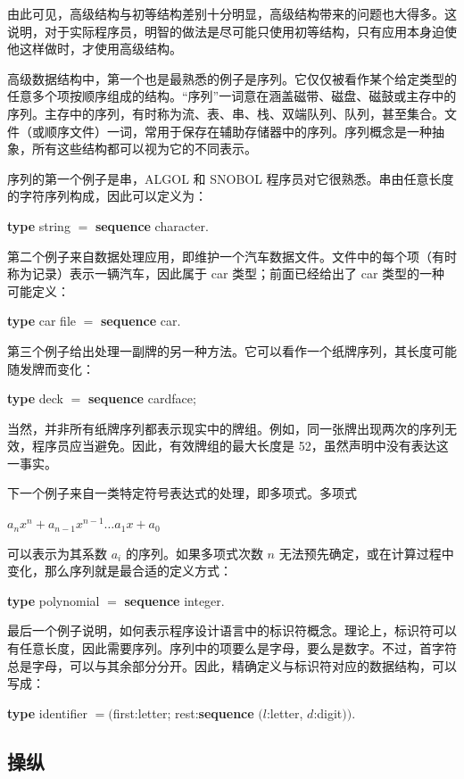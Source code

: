 由此可见，高级结构与初等结构差别十分明显，高级结构带来的问题也大得多。这说明，对于实际程序员，明智的做法是尽可能只使用初等结构，只有应用本身迫使他这样做时，才使用高级结构。

高级数据结构中，第一个也是最熟悉的例子是序列。它仅仅被看作某个给定类型的任意多个项按顺序组成的结构。“序列”一词意在涵盖磁带、磁盘、磁鼓或主存中的序列。主存中的序列，有时称为流、表、串、栈、双端队列、队列，甚至集合。文件（或顺序文件）一词，常用于保存在辅助存储器中的序列。序列概念是一种抽象，所有这些结构都可以视为它的不同表示。

序列的第一个例子是串，ALGOL 和 SNOBOL 程序员对它很熟悉。串由任意长度的字符序列构成，因此可以定义为：

\quad \textbf{type} string $=$ \textbf{sequence} character.

第二个例子来自数据处理应用，即维护一个汽车数据文件。文件中的每个项（有时称为记录）表示一辆汽车，因此属于 car 类型；前面已经给出了 car 类型的一种可能定义：

\quad \textbf{type} car file $=$ \textbf{sequence} car.

第三个例子给出处理一副牌的另一种方法。它可以看作一个纸牌序列，其长度可能随发牌而变化：

\quad \textbf{type} deck $=$ \textbf{sequence} cardface;

\noindent
当然，并非所有纸牌序列都表示现实中的牌组。例如，同一张牌出现两次的序列无效，程序员应当避免。因此，有效牌组的最大长度是 52，虽然声明中没有表达这一事实。

下一个例子来自一类特定符号表达式的处理，即多项式。多项式

$a_n x^n + a_{n-1}x^{n-1}\dots a_1 x + a_0$

\noindent
可以表示为其系数 $a_i$ 的序列。如果多项式次数 $n$ 无法预先确定，或在计算过程中变化，那么序列就是最合适的定义方式：

\quad \textbf{type} polynomial $=$ \textbf{sequence} integer.

最后一个例子说明，如何表示程序设计语言中的标识符概念。理论上，标识符可以有任意长度，因此需要序列。序列中的项要么是字母，要么是数字。不过，首字符总是字母，可以与其余部分分开。因此，精确定义与标识符对应的数据结构，可以写成：

\quad \textbf{type} identifier $= ($first:letter; rest:\textbf{sequence} $(l$:letter, $d$:digit$))$.

\subsection{操纵}

